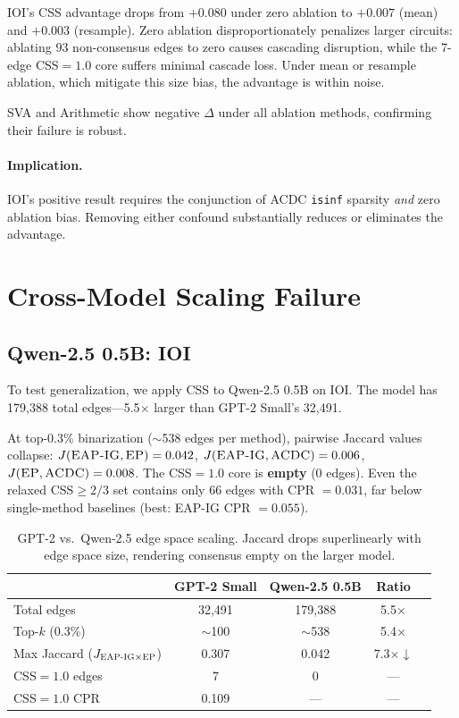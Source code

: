 \documentclass[11pt,a4paper]{article}
\newcommand{\css}{\textsc{CSS}}
\newcommand{\eapig}{\textsc{EAP-IG}}
\newcommand{\ep}{\textsc{EP}}
\newcommand{\acdc}{\textsc{ACDC}}
\begin{document}
IOI's \css{} advantage drops from $+0.080$ under zero ablation to $+0.007$ (mean) and $+0.003$ (resample).
Zero ablation disproportionately penalizes larger circuits: ablating 93 non-consensus edges to zero causes cascading disruption, while the 7-edge \css{}$= 1.0$ core suffers minimal cascade loss.
Under mean or resample ablation, which mitigate this size bias, the advantage is within noise.

SVA and Arithmetic show negative $\Delta$ under all ablation methods, confirming their failure is robust.

\paragraph{Implication.} IOI's positive result requires the conjunction of \acdc{} \texttt{isinf} sparsity \emph{and} zero ablation bias. Removing either confound substantially reduces or eliminates the advantage.

\section{Cross-Model Scaling Failure}
\label{sec:scaling}

\subsection{Qwen-2.5 0.5B: IOI}

To test generalization, we apply \css{} to Qwen-2.5 0.5B on IOI.
The model has 179,388 total edges---5.5$\times$ larger than GPT-2 Small's 32,491.

At top-0.3\% binarization ($\sim$538 edges per method), pairwise Jaccard values collapse:
$J(\text{\eapig{}}, \text{\ep{}}) = 0.042$,
$J(\text{\eapig{}}, \text{\acdc{}}) = 0.006$,
$J(\text{\ep{}}, \text{\acdc{}}) = 0.008$.
The \css{}$= 1.0$ core is \textbf{empty} (0 edges).
Even the relaxed \css{}$\ge 2/3$ set contains only 66 edges with CPR $= 0.031$, far below single-method baselines (best: \eapig{} CPR $= 0.055$).

\begin{table}[t]
\centering
\small
\begin{tabular}{lcccc}
\toprule
 & \textbf{GPT-2 Small} & \textbf{Qwen-2.5 0.5B} & \textbf{Ratio} \\
\midrule
Total edges     & 32,491  & 179,388 & 5.5$\times$ \\
Top-$k$ (0.3\%) & $\sim$100 & $\sim$538 & 5.4$\times$ \\
Max Jaccard ($J_{\eapig{} \times \ep{}}$) & 0.307   & 0.042   & 7.3$\times\downarrow$ \\
\css{}$= 1.0$ edges & 7 & 0 & --- \\
\css{}$= 1.0$ CPR   & 0.109 & --- & --- \\
\bottomrule
\end{tabular}
\caption{GPT-2 vs.\ Qwen-2.5 edge space scaling. Jaccard drops superlinearly with edge space size, rendering consensus empty on the larger model.}
\label{tab:scaling}
\end{table}
\end{document}
